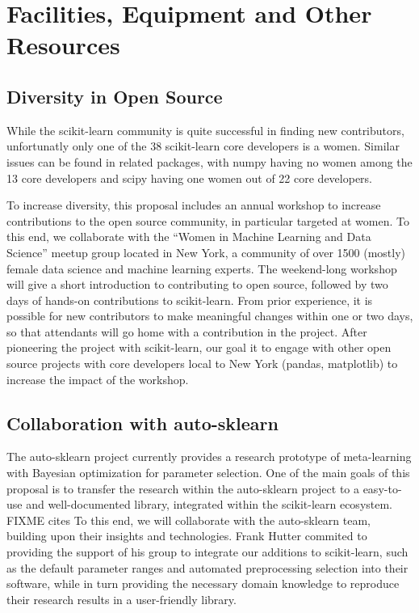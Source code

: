 \section{Facilities, Equipment and Other Resources}
\subsection{Diversity in Open Source}
While the scikit-learn community is quite successful in finding new contributors,
unfortunatly only one of the 38 scikit-learn core developers is a women.
Similar issues can be found in related packages, with numpy having no women among the 13 core
developers and scipy having one women out of 22 core developers.

To increase diversity, this proposal includes an annual workshop to increase
contributions to the open source community, in particular targeted at women.
To this end, we collaborate with the ``Women in Machine Learning and Data Science''
meetup group located in New York, a community of over 1500 (mostly) female data science and
machine learning experts.
The weekend-long workshop will give a short introduction to contributing to open source,
followed by two days of hands-on contributions to scikit-learn.
From prior experience, it is possible for new contributors to make meaningful changes
within one or two days, so that attendants will go home with a contribution
in the project. After pioneering the project with scikit-learn, our goal
it to engage with other open source projects with core developers local to New York
(pandas, matplotlib) to increase the impact of the workshop.

\subsection{Collaboration with auto-sklearn}
The auto-sklearn project currently provides a research prototype of meta-learning
with Bayesian optimization for parameter selection. One of the main goals of this proposal
is to transfer the research within the auto-sklearn project to a easy-to-use and well-documented
library, integrated within the scikit-learn ecosystem. FIXME cites
To this end, we will collaborate with the auto-sklearn team, building upon their insights
and technologies. Frank Hutter commited to providing the support of his group to integrate our
additions to scikit-learn, such as the default parameter ranges and automated preprocessing selection
into their software, while in turn providing the necessary domain knowledge to reproduce
their research results in a user-friendly library.

